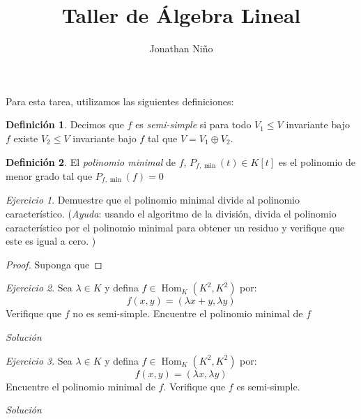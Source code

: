 \documentclass[11pt,a4paper]{article}
\author{Jonathan Niño}
\title{Taller de Álgebra Lineal}
\theoremstyle{definition}
\newtheorem{defn}{Definición}[section]
\theoremstyle{remark}
\newtheorem{exc}{Ejercicio}
\newcommand{\Hom}{\operatorname{Hom}}
\begin{document}
	\maketitle
	Para esta tarea, utilizamos las siguientes definiciones:
	
	\begin{defn}
		Decimos que $ f $ es \textit{semi-simple} si para todo $ V_1 \leq V $ invariante bajo $ f $ existe $ V_2 \leq V$ invariante bajo $ f $ tal que $ V = V_1 \oplus V_2  $.
	\end{defn}
	
	\begin{defn}
		El \emph{polinomio minimal } de $ f $, $ P_{f, \min}(t) \in K[t] $ es el polinomio de menor grado tal que $ P_{f,\min}(f) = 0 $
	\end{defn}
	
\begin{exc}
	Demuestre que el polinomio minimal divide al polinomio característico. (\textit{Ayuda}: usando el algoritmo de la división, divida el polinomio característico por el polinomio minimal para obtener un residuo y verifique que este es igual a cero. )
\end{exc}
	
\begin{proof}
	Suponga que
\end{proof}	
	
\begin{exc}
	Sea $ \lambda \in K $ y defina $ f \in \Hom_K(K^2,K^2) $ por:
	\[ f(x,y) = (\lambda x + y, \lambda y) \]
	Verifique que $ f $ no es semi-simple. Encuentre el polinomio minimal de $ f $
\end{exc}	

\textit{Solución}

\begin{exc}
	Sea $ \lambda \in K $ y defina $ f \in \Hom_K(K^2, K^2) $ por:
	\[ f(x,y) = (\lambda x, \lambda y) \]
	Encuentre el polinomio minimal de $ f $. Verifique que $ f $ es semi-simple.
\end{exc}

\textit{Solución}
\end{document}
